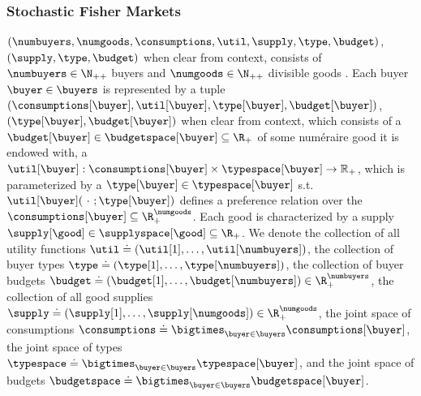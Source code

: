 \subsubsection{Stochastic Fisher Markets}
 $(\numbuyers, \numgoods, \consumptions, \util, \supply, \type, \budget)$, $(\supply, \type, \budget)$ when clear from context, consists of $\numbuyers \in \N_{++}$ buyers and $\numgoods \in \N_{++}$ divisible goods \cite{brainard2000compute}.
Each buyer $\buyer \in \buyers$ is represented by a tuple $(\consumptions[\buyer], \util[\buyer],\type[\buyer], \budget[\buyer])$, $(\type[\buyer], \budget[\buyer])$ when clear from context, which consists of a  $\budget[\buyer] \in \budgetspace[\buyer] \subseteq \R_+$ of some num\'eraire good it is endowed with, a 
$\util[\buyer]: \consumptions[\buyer] \times \typespace[\buyer] \to \mathbb{R}_+$, which is parameterized by a  $\type[\buyer] \in \typespace[\buyer]$ s.t. $\util[\buyer](\ \cdot \ ; \type[\buyer])$ defines a preference relation over the  $\consumptions[\buyer] \subseteq \R^\numgoods_+$.
Each good is characterized by a supply $\supply[\good] \in \supplyspace[\good] \subseteq \R_+$. We denote the collection of all utility functions $\util \doteq \left(\util[1], \hdots, \util[\numbuyers] \right)$, the collection of buyer types $\type \doteq \left(\type[1], \hdots, \type[\numbuyers]\right)$, the collection of buyer budgets $\budget \doteq (\budget[1], \hdots, \budget[\numbuyers]) \in \R_{+}^{\numbuyers}$, the collection of all good supplies $\supply \doteq (\supply[1], \hdots, \supply[\numgoods]) \in \R_{+}^{\numgoods}$, the joint space of consumptions $\consumptions \doteq \bigtimes_{\buyer \in \buyers} \consumptions[\buyer]$, the joint space of  types $\typespace \doteq \bigtimes_{\buyer \in \buyers} \typespace[\buyer]$, and the joint space of budgets $\budgetspace \doteq \bigtimes_{\buyer \in \buyers} \budgetspace[\buyer]$.



